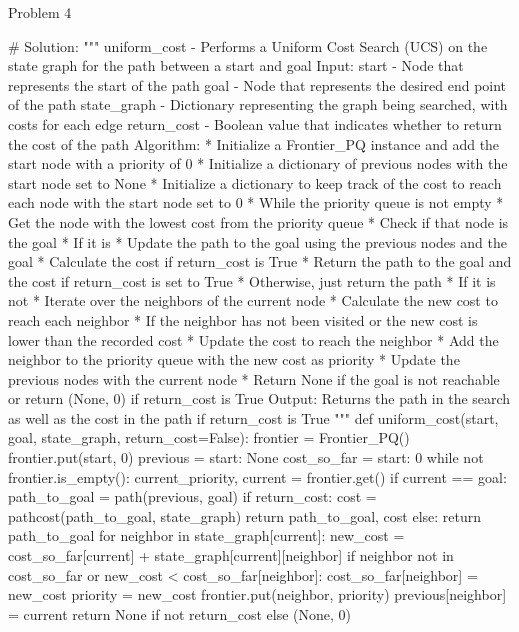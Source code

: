 \begin{problem}{Problem 4}
\begin{highlight}[Solution]
\begin{code}[Python]
    # Solution:
    """ uniform_cost - Performs a Uniform Cost Search (UCS) on the state graph for the path between a start and goal
        Input:
            start - Node that represents the start of the path
            goal - Node that represents the desired end point of the path
            state_graph - Dictionary representing the graph being searched, with costs for each edge
            return_cost - Boolean value that indicates whether to return the cost of the path
        Algorithm:
            * Initialize a Frontier_PQ instance and add the start node with a priority of 0
            * Initialize a dictionary of previous nodes with the start node set to None
            * Initialize a dictionary to keep track of the cost to reach each node with the start node set to 0
            * While the priority queue is not empty
                * Get the node with the lowest cost from the priority queue
                * Check if that node is the goal
                * If it is
                    * Update the path to the goal using the previous nodes and the goal
                    * Calculate the cost if return_cost is True
                    * Return the path to the goal and the cost if return_cost is set to True
                    * Otherwise, just return the path
                * If it is not
                    * Iterate over the neighbors of the current node
                    * Calculate the new cost to reach each neighbor
                    * If the neighbor has not been visited or the new cost is lower than the recorded cost
                        * Update the cost to reach the neighbor
                        * Add the neighbor to the priority queue with the new cost as priority
                        * Update the previous nodes with the current node
            * Return None if the goal is not reachable or return (None, 0) if return_cost is True
        Output:
            Returns the path in the search as well as the cost in the path if return_cost is True
    """
    def uniform_cost(start, goal, state_graph, return_cost=False):
        frontier = Frontier_PQ()
        frontier.put(start, 0)
        previous = {start: None}
        cost_so_far = {start: 0}
        while not frontier.is_empty():
            current_priority, current = frontier.get()
            if current == goal:
                path_to_goal = path(previous, goal)
                if return_cost:
                    cost = pathcost(path_to_goal, state_graph)
                    return path_to_goal, cost
                else:
                    return path_to_goal
            for neighbor in state_graph[current]:
                new_cost = cost_so_far[current] + state_graph[current][neighbor]
                if neighbor not in cost_so_far or new_cost < cost_so_far[neighbor]:
                    cost_so_far[neighbor] = new_cost
                    priority = new_cost
                    frontier.put(neighbor, priority)
                    previous[neighbor] = current
        return None if not return_cost else (None, 0)
    \end{code}
    \end{highlight}
\end{problem}

